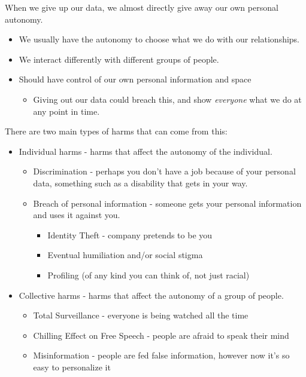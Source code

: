 \documentclass[12pt]{article}
\begin{document}
    When we give up our data, we almost directly give away our own personal autonomy.

    \begin{itemize}
        \item We usually have the autonomy to choose what we do with our relationships.
        \item We interact differently with different groups of people.
        \item Should have control of our own personal information and space
        \begin{itemize}
            \item Giving out our data could breach this, and show \textit{everyone} what we do at any point in time.
        \end{itemize}
    \end{itemize}

    There are two main types of harms that can come from this:

    \begin{itemize}
        \item Individual harms - harms that affect the autonomy of the individual.
        \begin{itemize}
            \item Discrimination - perhaps you don't have a job because of your personal data, something such as a disability that gets in your way.
            \item Breach of personal information - someone gets your personal information and uses it against you.
            \begin{itemize}
                \item Identity Theft - company pretends to be you
                \item Eventual humiliation and/or social stigma
                \item Profiling (of any kind you can think of, not just racial)
            \end{itemize}
        \end{itemize}
        \item Collective harms - harms that affect the autonomy of a group of people.
        \begin{itemize}
            \item Total Surveillance - everyone is being watched all the time
            \item Chilling Effect on Free Speech - people are afraid to speak their mind
            \item Misinformation - people are fed false information, however now it's so easy to personalize it
        \end{itemize}
    \end{itemize}
\end{document}
